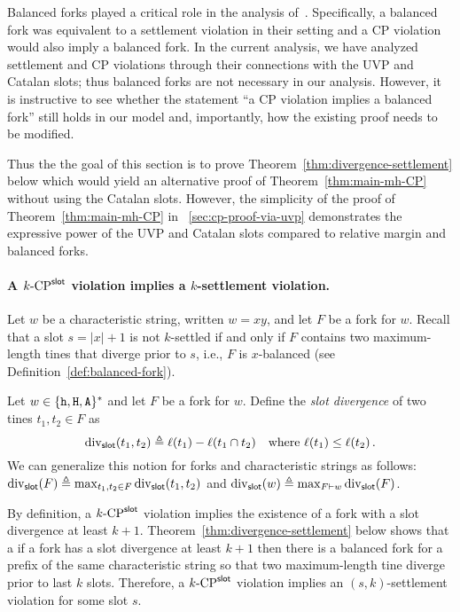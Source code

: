 Balanced forks played a critical role 
in the analysis of~\cite{LinearConsistency}. 
Specifically, a balanced fork was equivalent to a settlement violation in their setting 
and a CP violation would also imply a balanced fork.
In the current analysis, 
we have analyzed settlement and CP violations through 
their connections with the UVP and Catalan slots; 
thus balanced forks are not necessary in our analysis. 
However, it is instructive to see 
whether the statement ``a CP violation implies a balanced fork'' 
still holds in our model 
and, importantly, 
how the existing proof needs to be modified. 

Thus the the goal of this section is to prove 
Theorem~\ref{thm:divergence-settlement} below which 
would yield an alternative proof of Theorem~\ref{thm:main-mh-CP} 
without using the Catalan slots.
However, the simplicity of the proof of Theorem~\ref{thm:main-mh-CP} 
in \Section~\ref{sec:cp-proof-via-uvp} 
demonstrates the expressive power of the UVP and Catalan slots 
compared to relative margin and balanced forks.



\paragraph{A ${k}\text{-}\mathrm{CP}^{\mathsf{slot}}$ violation implies a $k$-settlement violation.}
Let $w$ be a characteristic string, written $w = xy$, 
and let $F$ be a fork for $w$. 
Recall that a slot $s = |x| + 1$ is not $k$-settled 
if and only if $F$ contains 
two maximum-length tines that diverge prior to $s$, 
i.e., $F$ is $x$-balanced (see Definition~\ref{def:balanced-fork}).


\begin{definition}\label{def:slot-divergence}
  Let $w \in \{\mathtt{h}, \mathtt{H}, \mathtt{A}\}^*$ and let $F$ be a fork for $w$. 
  Define the \emph{slot divergence} of 
  two tines $t_1, t_2 \in F$ 
  as 
  \begin{equation}\label{eq:slot-divergence-tines}
    \mathrm{div}_{\mathsf{slot}}(t_1, t_2) \triangleq \ell(t_1) - \ell(t_1 \cap t_2)
    \quad\text{where $\ell(t_1) \leq \ell(t_2)$}
    \,.
  \end{equation}
  We can generalize this notion for forks and characteristic strings as follows: 
  $\mathrm{div}_{\mathsf{slot}}(F) \triangleq \max_{t_1, t_2 \in F} \mathrm{div}_{\mathsf{slot}}(t_1, t_2)$ and 
  $\mathrm{div}_{\mathsf{slot}}(w) \triangleq \max_{F \vdash w} \mathrm{div}_{\mathsf{slot}}(F)$. 
\end{definition}

By definition, a ${k}\text{-}\mathrm{CP}^{\mathsf{slot}}$ violation 
implies the existence of a fork with a slot divergence at least $k + 1$. 
Theorem~\ref{thm:divergence-settlement} below 
shows that a if a fork has a slot divergence at least $k+1$ then 
there is a balanced fork for a prefix of the same characteristic string so that 
two maximum-length tine diverge prior to last $k$ slots. 
Therefore, a ${k}\text{-}\mathrm{CP}^{\mathsf{slot}}$ violation implies an $(s,k)$-settlement violation 
for some slot $s$.



